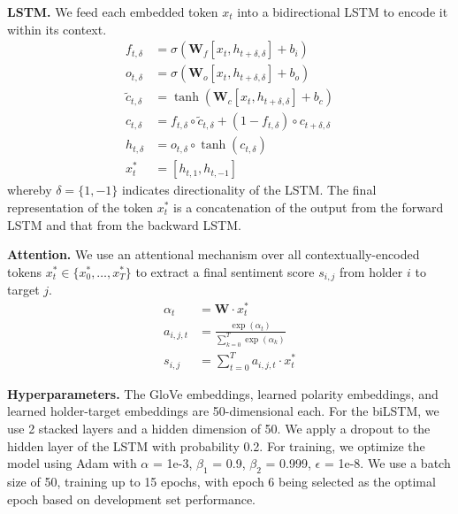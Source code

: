 \documentclass[11pt,a4paper]{article}
\begin{document}
\noindent\textbf{LSTM.}
We feed each embedded token $x_t$ into a bidirectional LSTM to encode it within its context.
\begin{align*}
f_{t, \delta} & = \sigma(\textbf{W}_f [x_t, h_{t + \delta, \delta}] + b_i) \\
o_{t, \delta} & = \sigma(\textbf{W}_o[x_t, h_{t + \delta,\delta}] + b_o) \\
\tilde{c}_{t, \delta} & = \tanh(\textbf{W}_c[x_t, h_{t + \delta, \delta}] + b_c) \\
c_{t, \delta} & = f_{t, \delta}\circ \tilde{c}_{t, \delta} + (1 - f_{t, \delta})\circ c_{t + \delta, \delta} \\
h_{t, \delta} & = o_{t, \delta}\circ \tanh(c_{t,\delta}) \\
x^*_t & = [h_{t, 1}, h_{t, -1}]
\end{align*}
whereby $\delta = \{1, -1\}$ indicates directionality of the LSTM.
The final representation of the token $x_t^*$ is a concatenation of the output from the forward LSTM and that from the backward LSTM.

\noindent\textbf{Attention.}
We use an attentional mechanism over all contextually-encoded tokens $x_t^*\in \{x_0^*, \dots, x_T^*\}$ to extract a final sentiment score $s_{i, j}$ from holder $i$ to target $j$.
\begin{align*}
\alpha_{t} & = \textbf{W} \cdot x^*_t \\
a_{i, j, t} & = \frac{\exp{(\alpha_t)}}{\sum^{T}_{k=0} \exp{(\alpha_k)}} \\
s_{i, j} & = \sum^{T}_{t = 0} a_{i, j, t}\cdot x_t^*
\end{align*}

\noindent\textbf{Hyperparameters.}
The GloVe embeddings, learned polarity embeddings, and learned holder-target embeddings are 50-dimensional each.
For the biLSTM, we use 2 stacked layers and a hidden dimension of 50. We apply a dropout to the hidden layer of the LSTM with probability 0.2.
For training, we optimize the model using Adam with $\alpha$ = 1e-3, $\beta_1$ = 0.9, $\beta_2$ = 0.999, $\epsilon$ = 1e-8. We use a batch size of 50, training up to 15 epochs, with epoch 6 being selected as the optimal epoch based on development set performance.
\end{document}
